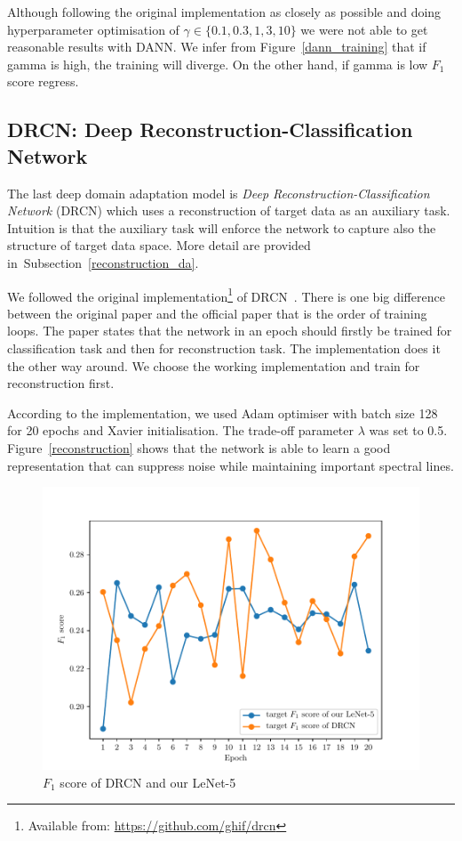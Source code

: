 Although following the original implementation as closely as possible
and doing hyperparameter optimisation of \(\gamma \in \{0.1, 0.3, 1, 3, 10\}\)
we were not able to get reasonable results with DANN.
We infer from Figure~\ref{dann_training} that
if gamma is high, the training will diverge.
On the other hand, if gamma is low \(F_1\) score regress.

\subsection{DRCN: Deep Reconstruction-Classification Network}

The last deep domain adaptation model is \textit{Deep Reconstruction-Classification Network} (DRCN)
which uses a reconstruction of target data as an auxiliary task.
Intuition is that the auxiliary task will enforce the network to capture also the structure of target data space.
More detail are provided in~Subsection~\ref{reconstruction_da}.

We followed the original implementation\footnote{Available from: \url{https://github.com/ghif/drcn}} of DRCN~\cite{ghifary2016}.
There is one big difference between the original paper and the official paper
that is the order of training loops.
The paper states that the network in an epoch
should firstly be trained for classification task
and then for reconstruction task.
The implementation does it the other way around.
We choose the working implementation and train for reconstruction first.

According to the implementation, we used Adam optimiser with batch size 128 for 20 epochs and Xavier initialisation.
The trade-off parameter \(\lambda\) was set to 0.5.
Figure~\ref{reconstruction} shows that the network is able to learn a good representation that can suppress noise
while maintaining important spectral lines.

\begin{figure}
\begin{center}
\includegraphics[width=.75\textwidth]{img/drcn_f1.pdf}
\end{center}
\caption{\(F_1\) score of DRCN and our LeNet-5}
\label{drcn_f1}
\end{figure}

